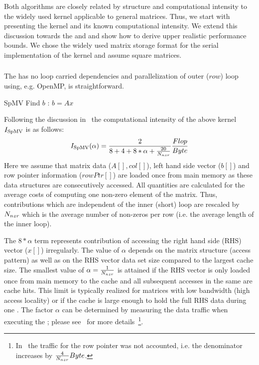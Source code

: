 Both algorithms are closely related by structure and computational intensity to the widely used \SpMV kernel applicable to general matrices. Thus, we start with presenting the \SpMV kernel and its known computational intensity. We extend this discussion towards the \SymmSpmv and \SYMMKACZ and show how to derive upper realistic performance bounds. We chose the widely used \CRS matrix storage format for the serial implementation of the kernel and assume square matrices.

\subsubsection{\SpMV}
The \SpMV has no loop carried dependencies and parallelization of outer ($row$) loop using, e.g. OpenMP, is straightforward. 
\begin{algorithm}[H]
	\caption{SpMV Find $b$ : $b=A x$} 
	\label{alg:SpMV}
	\begin{algorithmic}[1]
		\ENDFOR
		\ENDFOR
	\end{algorithmic}
\end{algorithm}
Following the discussion in~\cite{Moritz_sell} the computational intensity of the above kernel $I_\mathrm{SpMV}$  is as follows:
\begin{equation}
\label{eq:SpMV_intensity}
I_\mathrm{\SpMV} (\alpha)= \frac{2}{8+4+8*\alpha+\frac{20}{\NNZRmath}} \frac{Flop}{Byte} \\
\end{equation}
Here we assume that matrix data  ($A[], col[]$), left hand side vector ($b[]$) and row pointer information ($rowPtr[]$) are loaded once from main memory as these data structures are consecutively accessed. All quantities are calculated for the average costs of computing one non-zero element of the matrix. Thus, contributions which are independent of the inner (short) loop are rescaled by $N_{nzr}$ which is the average number of non-zeros per row (i.e. the average length of the inner loop).

The $8*\alpha$ term represents contribution of accessing the right hand side (RHS) vector ($x[]$) irregularly. The value of $\alpha$ depends on the matrix structure (access pattern) as well as on the RHS vector data set size compared to the largest cache size. The smallest value of $\alpha=\frac{1}{N_{nzr}}$ is attained if the RHS vector is only loaded once from main memory to the cache and all subsequent accesses in the same \SpMV are cache hits. This limit is typically realized for matrices with low bandwidth (high access locality) or if the cache is large enough to hold the full RHS data during one \SpMV. The factor $\alpha$ can be determined by measuring the data traffic when executing the \SpMV; please see~\cite{Moritz_sell} for more details~\footnote{In~\cite{Moritz_sell} the traffic for the row pointer was not accounted, i.e. the denominator increases by $\frac{4}{N_{nzr}} Byte$.}.

